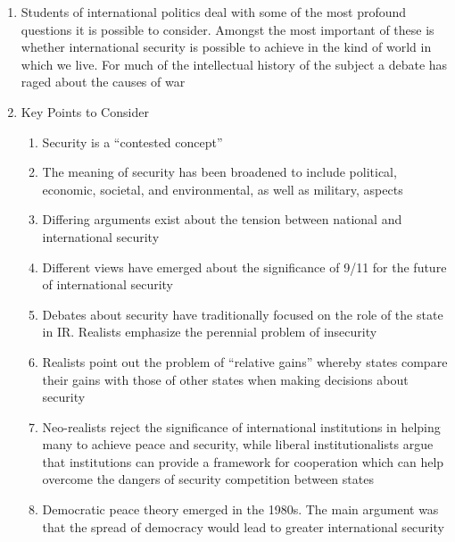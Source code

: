 \documentclass[12pt]{article}
\begin{document}
\begin{enumerate}
        \begin{enumerate}

          \item Students of international politics deal with some of the most profound questions it is possible to consider. Amongst the most important of these is whether international security is possible to achieve in the kind of world in which we live. For much of the intellectual history of the subject a debate has raged about the causes of war

          \item Key Points to Consider

            \begin{enumerate}

              \item Security is a “contested concept”

              \item The meaning of security has been broadened to include political, economic, societal, and environmental, as well as military, aspects

              \item Differing arguments exist about the tension between national and international security

              \item Different views have emerged about the significance of 9/11 for the future of international security

              \item Debates about security have traditionally focused on the role of the state in IR. Realists emphasize the perennial problem of insecurity

              \item Realists point out the problem of “relative gains” whereby states compare their gains with those of other states when making decisions about security

              \item Neo-realists reject the significance of international institutions in helping many to achieve peace and security, while liberal institutionalists argue that institutions can provide a framework for cooperation which can help overcome the dangers of security competition between states

              \item Democratic peace theory emerged in the 1980s. The main argument was that the spread of democracy would lead to greater international security


\end{enumerate}
\end{enumerate}
\end{enumerate}
\end{document}
